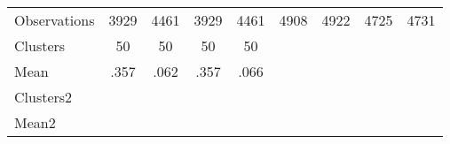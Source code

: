 {\begin{tabular}{l*{8}{c}}
\midrule
Observations    &     3929&     4461&     3929&     4461&     4908&     4922&     4725&     4731\\
Clusters        &       50&       50&       50&       50&         &         &         &         \\
Mean            &     .357&     .062&     .357&     .066&         &         &         &         \\
Clusters2       &         &         &         &         &         &         &         &         \\
Mean2           &         &         &         &         &         &         &         &         \\
\bottomrule
\end{tabular}
}
